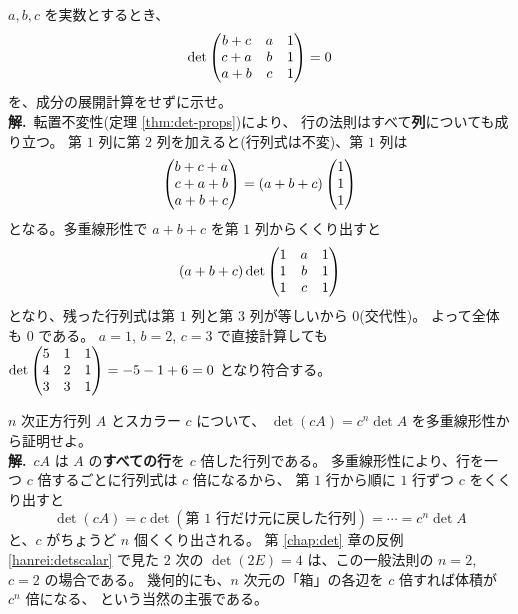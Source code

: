\begin{rei}[例題・標準(文字を含む行列と列の操作)]\label{rei:gendet-col}
$a, b, c$ を実数とするとき、
\[
\det \begin{pmatrix}b + c & a & 1 \\ c + a & b & 1 \\ a + b & c & 1\end{pmatrix} = 0
\]
を、成分の展開計算をせずに示せ。\\
\textbf{解.}\ 転置不変性(定理 \ref{thm:det-props})により、
行の法則はすべて\textbf{列}についても成り立つ。
第 $1$ 列に第 $2$ 列を加えると(行列式は不変)、第 $1$ 列は
\[
\begin{pmatrix}b + c + a \\ c + a + b \\ a + b + c\end{pmatrix} = (a + b + c)\begin{pmatrix}1 \\ 1 \\ 1\end{pmatrix}
\]
となる。多重線形性で $a + b + c$ を第 $1$ 列からくくり出すと
\[
(a + b + c) \det \begin{pmatrix}1 & a & 1 \\ 1 & b & 1 \\ 1 & c & 1\end{pmatrix}
\]
となり、残った行列式は第 $1$ 列と第 $3$ 列が等しいから $0$(交代性)。
よって全体も $0$ である。
$a = 1$, $b = 2$, $c = 3$ で直接計算しても
$\det \begin{pmatrix}5 & 1 & 1 \\ 4 & 2 & 1 \\ 3 & 3 & 1\end{pmatrix} = -5 - 1 + 6 = 0$ となり符合する。
\end{rei}

\begin{rei}[例題・標準(証明:スカラー倍の行列式)]\label{rei:gendet-scalar}
$n$ 次正方行列 $A$ とスカラー $c$ について、
$\det(cA) = c^n \det A$ を多重線形性から証明せよ。\\
\textbf{解.}\ $cA$ は $A$ の\textbf{すべての行}を $c$ 倍した行列である。
多重線形性により、行を一つ $c$ 倍するごとに行列式は $c$ 倍になるから、
第 $1$ 行から順に $1$ 行ずつ $c$ をくくり出すと
\[
\det(cA) = c \det(\text{第 1 行だけ元に戻した行列}) = \cdots
= c^n \det A
\]
と、$c$ がちょうど $n$ 個くくり出される。
第 \ref{chap:det} 章の反例 \ref{hanrei:detscalar} で見た
$2$ 次の $\det(2E) = 4$ は、この一般法則の $n = 2$, $c = 2$ の場合である。
幾何的にも、$n$ 次元の「箱」の各辺を $c$ 倍すれば体積が $c^n$ 倍になる、
という当然の主張である。
\end{rei}

